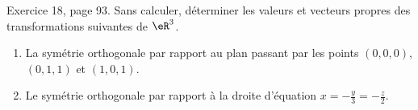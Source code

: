 \begin{exercice}\label{exoLineraire0041}

	Exercice 18, page 93. Sans calculer, déterminer les valeurs et vecteurs propres des transformations suivantes de $\eR^3$.
	\begin{enumerate}

		\item
			La symétrie orthogonale par rapport au plan passant par les points $(0,0,0)$, $(0,1,1)$ et $(1,0,1)$.
		\item
			Le symétrie orthogonale par rapport à la droite d'équation $x=-\frac{ y }{ 3 }=-\frac{ z }{ 2 }$.

	\end{enumerate}
	

\end{exercice}

